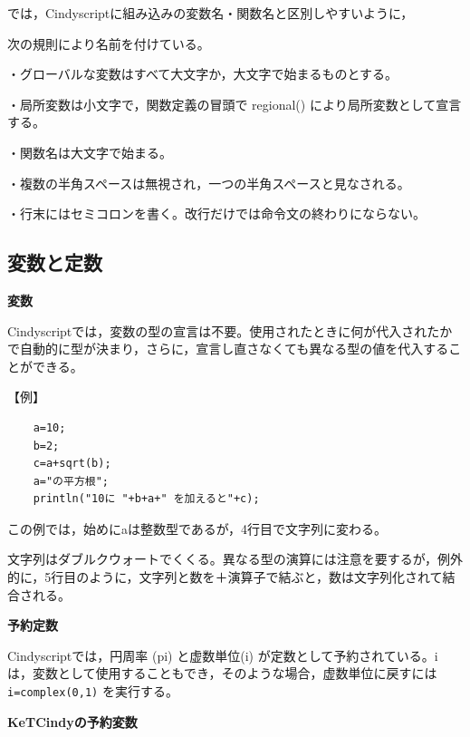 \documentclass[papersize,a4paper,12pt,uplatex]{jsarticle}
\begin{document}
\hspace{5mm}\ketcindy では，Cindyscriptに組み込みの変数名・関数名と区別しやすいように，

\hspace{5mm}次の規則により名前を付けている。

\hspace{5mm}・グローバルな変数はすべて大文字か，大文字で始まるものとする。

\hspace{5mm}・局所変数は小文字で，関数定義の冒頭で regional() により局所変数として宣言する。

\hspace{5mm}・関数名は大文字で始まる。

・複数の半角スペースは無視され，一つの半角スペースと見なされる。

・行末にはセミコロンを書く。改行だけでは命令文の終わりにならない。

\subsection{変数と定数}
\vspace{\baselineskip}
{\bf  変数}

Cindyscriptでは，変数の型の宣言は不要。使用されたときに何が代入されたかで自動的に型が決まり，さらに，宣言し直さなくても異なる型の値を代入することができる。

\vspace{\baselineskip}

【例】
\begin{verbatim}
    a=10;
    b=2;
    c=a+sqrt(b);
    a="の平方根";
    println("10に "+b+a+" を加えると"+c);
\end{verbatim}

この例では，始めにaは整数型であるが，4行目で文字列に変わる。

文字列はダブルクウォートでくくる。異なる型の演算には注意を要するが，例外的に，5行目のように，文字列と数を＋演算子で結ぶと，数は文字列化されて結合される。

\vspace{\baselineskip}
{\bf  予約定数}

Cindyscriptでは，円周率 (pi) と虚数単位(i) が定数として予約されている。i は，変数として使用することもでき，そのような場合，虚数単位に戻すには  \verb|i=complex(0,1)| を実行する。

\vspace{\baselineskip}
{\bf KeTCindyの予約変数}
\end{document}
